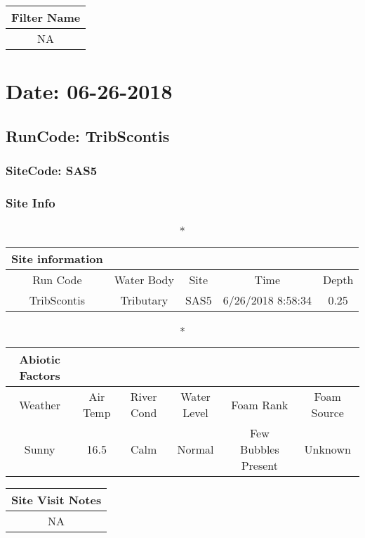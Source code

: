 \documentclass[
  letterpaper,
  DIV=11,
  numbers=noendperiod]{scrartcl}
\begin{document}
\begin{longtable*}{c}
\toprule
Filter Name \\ 
\midrule\addlinespace[2.5pt]
NA \\ 
\bottomrule
\end{longtable*}

\hypertarget{date-06-26-2018-6}{%
\section{Date: 06-26-2018}\label{date-06-26-2018-6}}

\hypertarget{runcode-tribscontis-6}{%
\subsection{RunCode: TribScontis}\label{runcode-tribscontis-6}}

\hypertarget{sitecode-sas5}{%
\subsubsection{SiteCode: SAS5}\label{sitecode-sas5}}

\subsubsection{Site Info}

\begin{longtable*}{ccccc}
\caption*{
{\large Site information}
} \\ 
\toprule
Run Code & Water Body & Site & Time & Depth \\ 
\midrule\addlinespace[2.5pt]
TribScontis & Tributary & SAS5 & 6/26/2018 8:58:34 & 0.25 \\ 
\bottomrule
\end{longtable*}

\begin{longtable*}{cccccc}
\caption*{
{\large Abiotic Factors}
} \\ 
\toprule
Weather & Air Temp & River Cond & Water Level & Foam Rank & Foam Source \\ 
\midrule\addlinespace[2.5pt]
Sunny & 16.5 & Calm & Normal & Few Bubbles Present & Unknown \\ 
\bottomrule
\end{longtable*}

\begin{longtable*}{c}
\toprule
Site Visit Notes \\ 
\midrule\addlinespace[2.5pt]
NA \\ 
\bottomrule
\end{longtable*}
\end{document}
